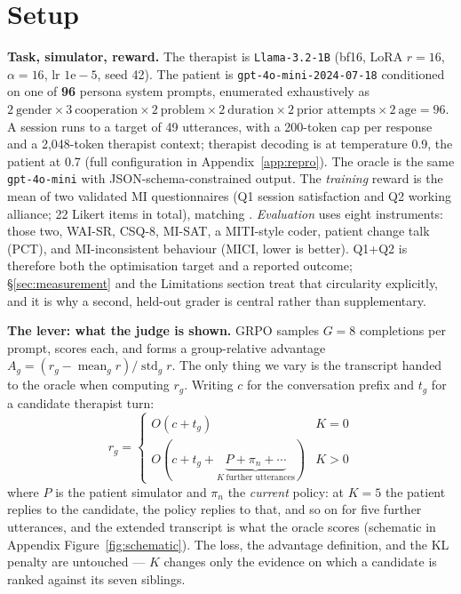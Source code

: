 \section{Setup}
\label{sec:setup}

\textbf{Task, simulator, reward.} The therapist is \texttt{Llama-3.2-1B} (bf16, LoRA $r{=}16$,
$\alpha{=}16$, lr $1\mathrm{e}{-}5$, seed 42). The patient is \texttt{gpt-4o-mini-2024-07-18}
conditioned on one of \textbf{96} persona system prompts, enumerated exhaustively as
$2\ \text{gender} \times 3\ \text{cooperation} \times 2\ \text{problem} \times 2\ \text{duration}
\times 2\ \text{prior attempts} \times 2\ \text{age} = 96$. A session runs to a target of 49
utterances, with a 200-token cap per response and a 2{,}048-token therapist context; therapist
decoding is at temperature 0.9, the patient at 0.7 (full configuration in
Appendix~\ref{app:repro}). The oracle is the same \texttt{gpt-4o-mini} with
JSON-schema-constrained output. The \emph{training} reward is the mean of two validated MI
questionnaires (Q1 session satisfaction and Q2 working alliance; 22 Likert items in total),
matching \citet{baruch2025pto}. \emph{Evaluation} uses eight instruments: those two, WAI-SR,
CSQ-8, MI-SAT, a MITI-style coder, patient change talk (PCT), and MI-inconsistent behaviour (MICI,
lower is better). Q1+Q2 is therefore both the optimisation target and a reported outcome;
\S\ref{sec:measurement} and the Limitations section treat that circularity explicitly, and
it is why a second, held-out grader is central rather than supplementary.

\textbf{The lever: what the judge is shown.}
\label{sec:setup-lever}
GRPO samples $G{=}8$ completions per prompt, scores each, and forms a group-relative advantage
$A_g = (r_g - \operatorname{mean}_g r)/\operatorname{std}_g r$. The only thing we vary is the
transcript handed to the oracle when computing $r_g$. Writing $c$ for the conversation prefix and
$t_g$ for a candidate therapist turn:
\[
r_g =
\begin{cases}
O(c + t_g) & K = 0\\[2pt]
O\!\left(c + t_g + \underbrace{P + \pi_n + \cdots}_{K\ \text{further utterances}}\right) & K > 0
\end{cases}
\]
where $P$ is the patient simulator and $\pi_n$ the \emph{current} policy: at $K{=}5$ the patient
replies to the candidate, the policy replies to that, and so on for five further utterances, and
the extended transcript is what the oracle scores (schematic in Appendix
Figure~\ref{fig:schematic}). The loss, the advantage definition, and the KL penalty are untouched
--- $K$ changes only the evidence on which a candidate is ranked against its seven siblings.

